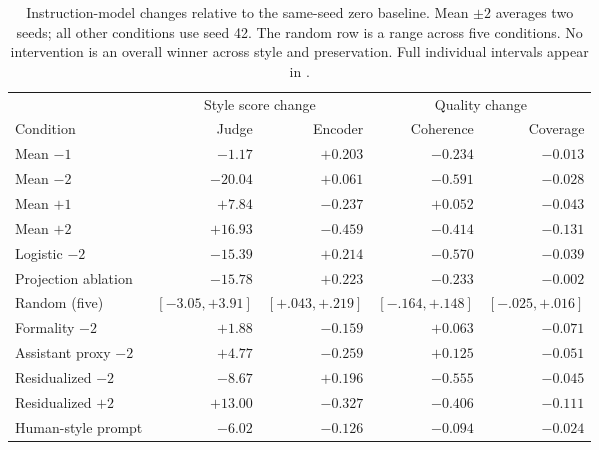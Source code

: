 \begin{table}[t]
\centering\small
\caption{Instruction-model changes relative to the same-seed zero baseline. Mean $\pm2$ averages two seeds; all other conditions use seed 42. The random row is a range across five conditions. No intervention is an overall winner across style and preservation. Full individual intervals appear in .}\label{tab:controls}
\begin{tabular}{@{}lrrrr@{}}
\toprule
& \multicolumn{2}{c}{Style score change} & \multicolumn{2}{c}{Quality change}\\
\cmidrule(lr){2-3}\cmidrule(lr){4-5}
Condition & Judge & Encoder & Coherence & Coverage\\
\midrule
Mean $-1$ & $-1.17$ & $+0.203$ & $-0.234$ & $-0.013$\\
Mean $-2$ & $-20.04$ & $+0.061$ & $-0.591$ & $-0.028$\\
Mean $+1$ & $+7.84$ & $-0.237$ & $+0.052$ & $-0.043$\\
Mean $+2$ & $+16.93$ & $-0.459$ & $-0.414$ & $-0.131$\\
Logistic $-2$ & $-15.39$ & $+0.214$ & $-0.570$ & $-0.039$\\
Projection ablation & $-15.78$ & $+0.223$ & $-0.233$ & $-0.002$\\
Random (five) & $[-3.05,+3.91]$ & $[+.043,+.219]$ & $[-.164,+.148]$ & $[-.025,+.016]$\\
Formality $-2$ & $+1.88$ & $-0.159$ & $+0.063$ & $-0.071$\\
Assistant proxy $-2$ & $+4.77$ & $-0.259$ & $+0.125$ & $-0.051$\\
Residualized $-2$ & $-8.67$ & $+0.196$ & $-0.555$ & $-0.045$\\
Residualized $+2$ & $+13.00$ & $-0.327$ & $-0.406$ & $-0.111$\\
Human-style prompt & $-6.02$ & $-0.126$ & $-0.094$ & $-0.024$\\
\bottomrule
\end{tabular}
\end{table}
